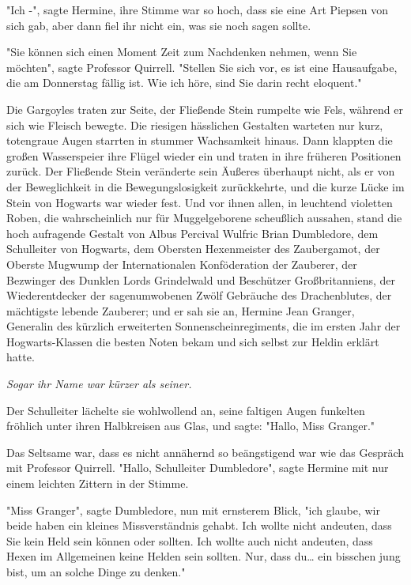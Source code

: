 {"Ich -", sagte Hermine, ihre Stimme war so hoch, dass sie eine Art Piepsen von sich gab, aber dann fiel ihr nicht ein, was sie noch sagen sollte.

"Sie können sich einen Moment Zeit zum Nachdenken nehmen, wenn Sie möchten", sagte Professor Quirrell. "Stellen Sie sich vor, es ist eine Hausaufgabe, die am Donnerstag fällig ist. Wie ich höre, sind Sie darin recht eloquent."

Die Gargoyles traten zur Seite, der Fließende Stein rumpelte wie Fels, während er sich wie Fleisch bewegte. Die riesigen hässlichen Gestalten warteten nur kurz, totengraue Augen starrten in stummer Wachsamkeit hinaus. Dann klappten die großen Wasserspeier ihre Flügel wieder ein und traten in ihre früheren Positionen zurück. Der Fließende Stein veränderte sein Äußeres überhaupt nicht, als er von der Beweglichkeit in die Bewegungslosigkeit zurückkehrte, und die kurze Lücke im Stein von Hogwarts war wieder fest. Und vor ihnen allen, in leuchtend violetten Roben, die wahrscheinlich nur für Muggelgeborene scheußlich aussahen, stand die hoch aufragende Gestalt von Albus Percival Wulfric Brian Dumbledore, dem Schulleiter von Hogwarts, dem Obersten Hexenmeister des Zaubergamot, der Oberste Mugwump der Internationalen Konföderation der Zauberer, der Bezwinger des Dunklen Lords Grindelwald und Beschützer Großbritanniens, der Wiederentdecker der sagenumwobenen Zwölf Gebräuche des Drachenblutes, der mächtigste lebende Zauberer; und er sah sie an, Hermine Jean Granger, Generalin des kürzlich erweiterten Sonnenscheinregiments, die im ersten Jahr der Hogwarts-Klassen die besten Noten bekam und sich selbst zur Heldin erklärt hatte.

\emph{Sogar ihr Name war kürzer als seiner.}

Der Schulleiter lächelte sie wohlwollend an, seine faltigen Augen funkelten fröhlich unter ihren Halbkreisen aus Glas, und sagte: "Hallo, Miss Granger."

Das Seltsame war, dass es nicht annähernd so beängstigend war wie das Gespräch mit Professor Quirrell. "Hallo, Schulleiter Dumbledore", sagte Hermine mit nur einem leichten Zittern in der Stimme.

"Miss Granger", sagte Dumbledore, nun mit ernsterem Blick, "ich glaube, wir beide haben ein kleines Missverständnis gehabt. Ich wollte nicht andeuten, dass Sie kein Held sein können oder sollten. Ich wollte auch nicht andeuten, dass Hexen im Allgemeinen keine Helden sein sollten. Nur, dass du… ein bisschen jung bist, um an solche Dinge zu denken."

}
